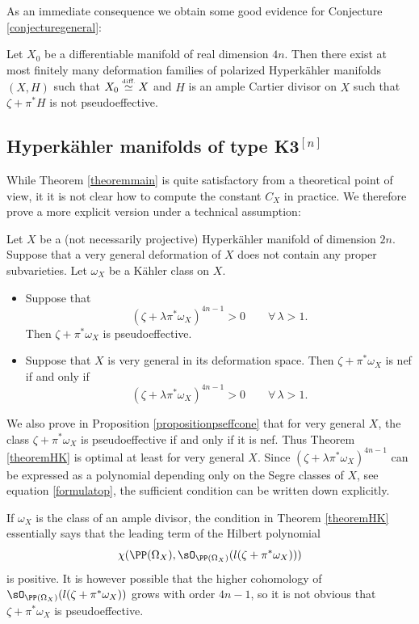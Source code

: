 As an immediate consequence we obtain some good evidence for Conjecture \ref{conjecturegeneral}:

\begin{corollary} \label{corollarygoodevidence}
Let $X_0$ be a differentiable manifold of real dimension $4n$. Then there exist
at most finitely many deformation families of polarized Hyperkähler manifolds $(X, H)$
such that $X_0 \stackrel{\mbox{\tiny diff.}}{\simeq} X$ and $H$ is an ample Cartier divisor on $X$ such that $\zeta + \pi^* H$
is not pseudoeffective.
\end{corollary}

\subsection{Hyperkähler manifolds of type K3$^{[n]}$}

While Theorem \ref{theoremmain} is quite satisfactory from a theoretical point of view, it
it is not clear how to compute the constant $C_X$ in practice. We therefore prove a more explicit version
under a technical assumption:

\begin{theorem}\label{theoremHK}
Let $X$ be a (not necessarily projective) Hyperkähler manifold of dimension $2n$.
Suppose that a very general deformation of $X$ does not contain any proper subvarieties.
Let $\omega_X$ be a Kähler class on $X$.
\begin{itemize}
\item Suppose that
\[
(\zeta + \lambda \pi^* \omega_X)^{4n-1} > 0 \qquad \forall\,\lambda > 1.
\]
Then $\zeta+\pi^*\omega_X$ is pseudoeffective.
\item Suppose that $X$ is very general in its deformation space. Then
$\zeta+\pi^*\omega_X$ is nef if and only if
\[
(\zeta + \lambda \pi^* \omega_X)^{4n-1} > 0 \qquad \forall\,\lambda > 1.
\]
\end{itemize}
\end{theorem}

We also prove in Proposition \ref{propositionpseffcone} that for very general $X$, the class
$\zeta+\pi^*\omega_X$ is pseudoeffective if and only if it is nef. Thus Theorem \ref{theoremHK} is optimal at least
for very general $X$. Since $(\zeta + \lambda \pi^* \omega_X)^{4n-1}$ can be expressed as a polynomial depending only on the Segre classes of $X$, see equation \eqref{formulatop}, the sufficient condition
can be written down explicitly.

If $\omega_X$ is the class of an ample divisor, the condition in
Theorem \ref{theoremHK} essentially says that the leading term of the Hilbert polynomial
\[
\chi(\PP(\Omega_X), \sO_{\PP(\Omega_X)}(l(\zeta + \pi^* \omega_X)))
\]
is positive. It is however possible that the higher cohomology of $\sO_{\PP(\Omega_X)}(l(\zeta + \pi^* \omega_X))$ grows with order $4n-1$, so it is not obvious
that $\zeta + \pi^* \omega_X$ is pseudoeffective.

